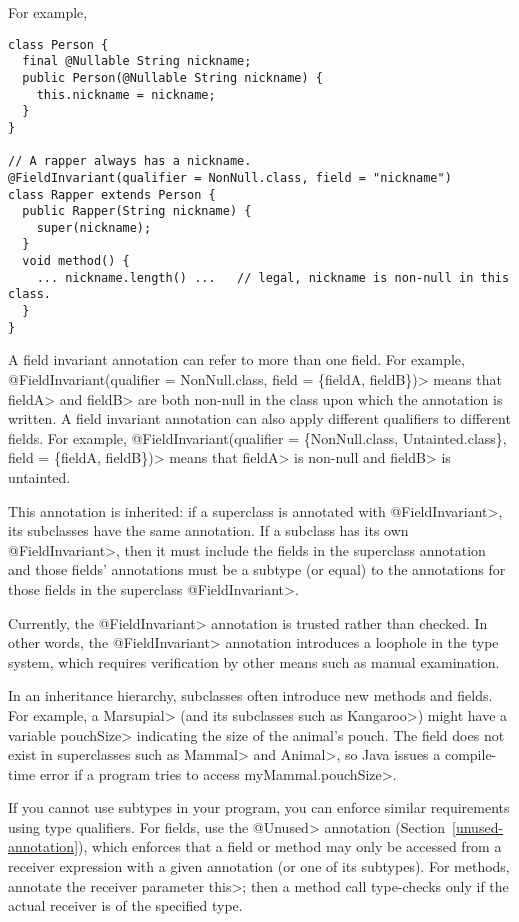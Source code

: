 For example,
\begin{Verbatim}
class Person {
  final @Nullable String nickname;
  public Person(@Nullable String nickname) {
    this.nickname = nickname;
  }
}

// A rapper always has a nickname.
@FieldInvariant(qualifier = NonNull.class, field = "nickname")
class Rapper extends Person {
  public Rapper(String nickname) {
    super(nickname);
  }
  void method() {
    ... nickname.length() ...   // legal, nickname is non-null in this class.
  }
}
\end{Verbatim}
 A field invariant annotation can refer to more than one field. For example,
\<@FieldInvariant(qualifier = NonNull.class, field = \{fieldA, fieldB\})> means
that \<fieldA> and \<fieldB> are both non-null in the class upon which the
annotation is written.  A field invariant annotation
can also apply different qualifiers to different fields. For example,
\<@FieldInvariant(qualifier = \{NonNull.class, Untainted.class\}, field =
\{fieldA, fieldB\})> means that \<fieldA> is non-null and \<fieldB> is untainted.

This annotation is inherited:  if a superclass is annotated with
\<@FieldInvariant>, its subclasses have the same annotation. If a subclass has its
own \<@FieldInvariant>, then it must include the fields in the superclass
annotation and those fields' annotations must be a subtype (or equal) to the
annotations for those fields in the superclass \<@FieldInvariant>.

Currently, the \<@FieldInvariant> annotation is trusted rather than
checked.  In other words, the \<@FieldInvariant> annotation introduces a
loophole in the type system, which requires verification by other means
such as manual examination.



In an inheritance hierarchy, subclasses often introduce new methods and
fields.  For example, a \<Marsupial> (and its subclasses such as
\<Kangaroo>) might have a variable \<pouchSize> indicating the size of the animal's
pouch.  The field does not exist in superclasses such as
\<Mammal> and \<Animal>, so Java issues a compile-time
error if a program tries to access \<myMammal.pouchSize>.

If you cannot use subtypes in your program, you can enforce similar
requirements using type qualifiers.
For fields, use the \<@Unused> annotation (Section~\ref{unused-annotation}), which enforces that a field or method may only
be accessed from a receiver expression with a given annotation (or one of
its subtypes).
For methods, annotate the receiver parameter \<this>; then a method call
type-checks only if the actual receiver is of the specified type.

